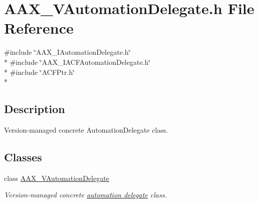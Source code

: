 \hypertarget{a00301}{}\section{A\+A\+X\+\_\+\+V\+Automation\+Delegate.\+h File Reference}
\label{a00301}
{\ttfamily \#include \char`\"{}A\+A\+X\+\_\+\+I\+Automation\+Delegate.\+h\char`\"{}}\\*
{\ttfamily \#include \char`\"{}A\+A\+X\+\_\+\+I\+A\+C\+F\+Automation\+Delegate.\+h\char`\"{}}\\*
{\ttfamily \#include \char`\"{}A\+C\+F\+Ptr.\+h\char`\"{}}\\*


\subsection{Description}
Version-\/managed concrete Automation\+Delegate class. 

\subsection*{Classes}
\begin{DoxyCompactItemize}
\item 
class \hyperlink{a00129}{A\+A\+X\+\_\+\+V\+Automation\+Delegate}
\begin{DoxyCompactList}\small\item\em Version-\/managed concrete \hyperlink{a00086}{automation delegate} class. \end{DoxyCompactList}\end{DoxyCompactItemize}
